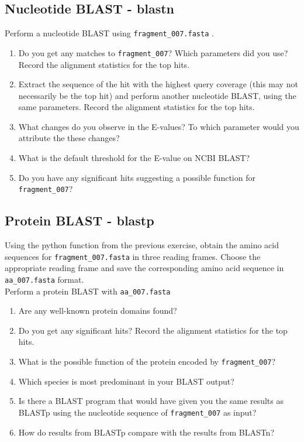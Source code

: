 \documentclass[a4paper,11pt]{article}
\begin{document}
\subsection{Nucleotide BLAST - blastn}
Perform a nucleotide BLAST using \texttt{fragment\_007.fasta} .
\begin{enumerate}
\item Do you get any matches to \texttt{fragment\_007}? Which parameters did you use? Record the alignment statistics for the top hits.
\item Extract the sequence of the hit with the highest query coverage (this may not necessarily be the top hit) and perform another nucleotide BLAST, using the same parameters. Record the alignment statistics for the top hits.
\item What changes do you observe in the E-values? To which parameter would you attribute the these changes?  
\item What is the default threshold for the E-value on NCBI BLAST?
\item Do you have any significant hits suggesting a possible function for \texttt{fragment\_007}? 
\end{enumerate}

\subsection{Protein BLAST - blastp}

Using the python function from the previous exercise, obtain the amino acid sequences for \texttt{fragment\_007.fasta} in three reading frames. Choose the appropriate reading frame and save the corresponding amino acid sequence in \texttt{aa\_007.fasta} format.\\

Perform a protein BLAST with \texttt{aa\_007.fasta} 

\begin{enumerate}
\item Are any well-known protein domains found? 
\item Do you get any significant hits? Record the alignment statistics for the top hits. 
\item What is the possible function of the protein encoded by \texttt{fragment\_007}?
\item Which species is most predominant in your BLAST output?
\item Is there a BLAST program that would have given you the same results as BLASTp using the nucleotide sequence of \texttt{fragment\_007} as input?
\item How do results from BLASTp compare with the results from BLASTn?
\end{enumerate}
\end{document}
